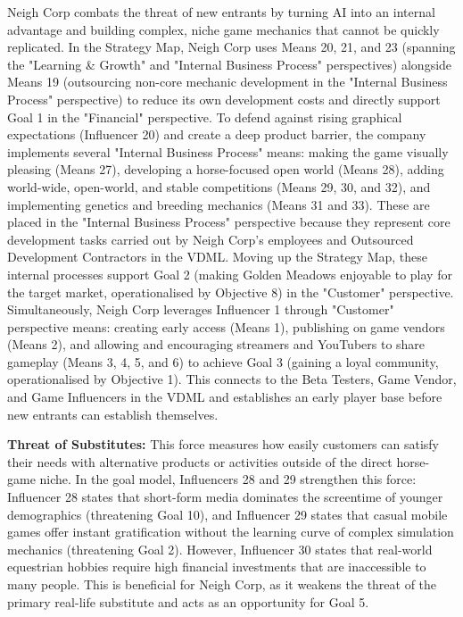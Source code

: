 \documentclass{article}
\begin{document}
Neigh Corp combats the threat of new entrants by turning AI into an internal advantage and building complex, niche game mechanics that cannot be quickly replicated. In the Strategy Map, Neigh Corp uses Means 20, 21, and 23 (spanning the "Learning \& Growth" and "Internal Business Process" perspectives) alongside Means 19 (outsourcing non-core mechanic development in the "Internal Business Process" perspective) to reduce its own development costs and directly support Goal 1 in the "Financial" perspective. To defend against rising graphical expectations (Influencer 20) and create a deep product barrier, the company implements several "Internal Business Process" means: making the game visually pleasing (Means 27), developing a horse-focused open world (Means 28), adding world-wide, open-world, and stable competitions (Means 29, 30, and 32), and implementing genetics and breeding mechanics (Means 31 and 33). These are placed in the "Internal Business Process" perspective because they represent core development tasks carried out by Neigh Corp's employees and Outsourced Development Contractors in the VDML. Moving up the Strategy Map, these internal processes support Goal 2 (making Golden Meadows enjoyable to play for the target market, operationalised by Objective 8) in the "Customer" perspective. Simultaneously, Neigh Corp leverages Influencer 1 through "Customer" perspective means: creating early access (Means 1), publishing on game vendors (Means 2), and allowing and encouraging streamers and YouTubers to share gameplay (Means 3, 4, 5, and 6) to achieve Goal 3 (gaining a loyal community, operationalised by Objective 1). This connects to the Beta Testers, Game Vendor, and Game Influencers in the VDML and establishes an early player base before new entrants can establish themselves.

\textbf{Threat of Substitutes:}
This force measures how easily customers can satisfy their needs with alternative products or activities outside of the direct horse-game niche. In the goal model, Influencers 28 and 29 strengthen this force: Influencer 28 states that short-form media dominates the screentime of younger demographics (threatening Goal 10), and Influencer 29 states that casual mobile games offer instant gratification without the learning curve of complex simulation mechanics (threatening Goal 2). However, Influencer 30 states that real-world equestrian hobbies require high financial investments that are inaccessible to many people. This is beneficial for Neigh Corp, as it weakens the threat of the primary real-life substitute and acts as an opportunity for Goal 5.
\end{document}
